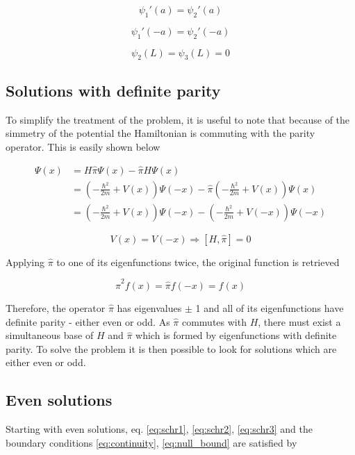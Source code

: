 \documentclass{article}
\begin{document}
\begin{equation}
\label{eq:continuity_derivative}
\psi_{1}'(a) =  \psi_{2}'(a)
\end{equation}

\begin{equation}
\psi_{1}'(-a) =  \psi_{2}'(-a)
\end{equation}

\begin{equation}
\label{eq:null_bound}
\psi_{2}(L) =  \psi_{3}(L) = 0
\end{equation}

\subsection{Solutions with definite parity}
To simplify the treatment of the problem, it is useful to note that because of the simmetry of the potential the Hamiltonian is commuting with the parity operator. This is easily shown below

\begin{align*}
[H, \hat{\pi}] \Psi(x) & = H \hat{\pi} \Psi(x) - \hat{\pi} H \Psi(x) \\ 
  & = \left(-\frac{\hbar^2}{2m} + V(x)\right)\Psi(-x) -  \hat{\pi} \left(-\frac{\hbar^2}{2m} + V(x)\right)\Psi(x) \\ & = \left(-\frac{\hbar^2}{2m} + V(x)\right)\Psi(-x) -  \left(-\frac{\hbar^2}{2m} + V(-x)\right)\Psi(-x)
\end{align*}

\begin{equation}
\label{eq:parity_commutation}
V(x) = V(-x) \Rightarrow \left[H,\hat{\pi} \right] = 0
\end{equation}

Applying \(\hat{\pi}\) to one of its eigenfunctions twice, the original function is retrieved

\begin{equation}
\hat{\pi}^2f(x) = \hat{\pi}f(-x) = f(x)
\end{equation}

Therefore, the operator \(\hat{\pi}\) has eigenvalues \(\pm\) 1 and all of its eigenfunctions have definite parity - either even or odd. As \(\hat{\pi}\) commutes with \(H\), there must exist a simultaneous base of \(H\) and \(\hat{\pi}\) which is formed by eigenfunctions with definite parity. To solve the problem it is then possible to look for solutions which are either even or odd.

\subsection{Even solutions}
Starting with even solutions, eq. \eqref{eq:schr1}, \eqref{eq:schr2}, \eqref{eq:schr3} and the boundary conditions \eqref{eq:continuity}, \eqref{eq:null_bound} are satisfied by
\end{document}
